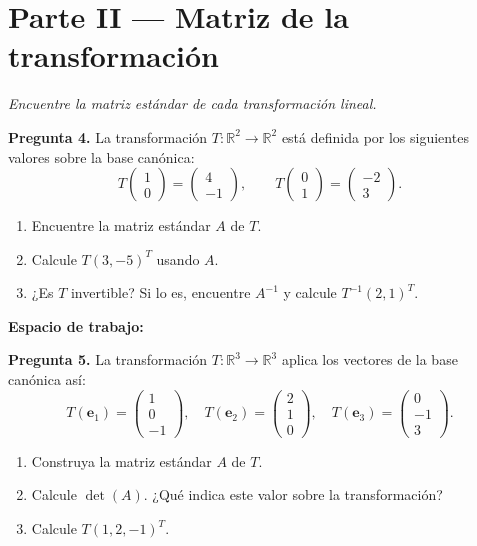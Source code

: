 \documentclass[12pt, letterpaper]{article}
\newcommand{\R}{\mathbb{R}}
\newcommand{\mat}[1]{\begin{pmatrix}#1\end{pmatrix}}
\begin{document}
\section*{\color{azuloscuro} Parte II — Matriz de la transformación}
\textit{Encuentre la matriz estándar de cada transformación lineal.}

\vspace{6pt}

\begin{cajapregunta}
\textbf{Pregunta 4.}
La transformación $T:\R^2\to\R^2$ está definida por los siguientes valores sobre la base canónica:
\[
  T\!\mat{1\\0} = \mat{4\\-1}, \qquad T\!\mat{0\\1} = \mat{-2\\3}.
\]
\begin{enumerate}[label=\alph*)]
  \item Encuentre la matriz estándar $A$ de $T$.
  \item Calcule $T(3,-5)^T$ usando $A$.
  \item ¿Es $T$ invertible? Si lo es, encuentre $A^{-1}$ y calcule $T^{-1}(2,1)^T$.
\end{enumerate}
\end{cajapregunta}

\vspace{4pt}

\noindent\textbf{Espacio de trabajo:}
\vspace{6cm}

\newpage

\begin{cajapregunta}
\textbf{Pregunta 5.}
La transformación $T:\R^3\to\R^3$ aplica los vectores de la base canónica así:
\[
  T(\mathbf{e}_1) = \mat{1\\0\\-1},\quad
  T(\mathbf{e}_2) = \mat{2\\1\\0},\quad
  T(\mathbf{e}_3) = \mat{0\\-1\\3}.
\]
\begin{enumerate}[label=\alph*)]
  \item Construya la matriz estándar $A$ de $T$.
  \item Calcule $\det(A)$. ¿Qué indica este valor sobre la transformación?
  \item Calcule $T(1,2,-1)^T$.
\end{enumerate}
\end{cajapregunta}
\end{document}
